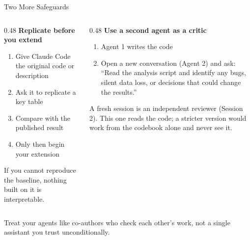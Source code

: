 \documentclass[aspectratio=169, 11pt]{beamer}
\begin{document}
\begin{frame}{Two More Safeguards}
  \begin{columns}[T]
    \begin{column}{0.48\textwidth}
      \textbf{Replicate before you extend}
      \begin{enumerate}
        \small
        \item Give Claude Code the original code or description
        \item Ask it to replicate a key table
        \item Compare with the published result
        \item Only then begin your extension
      \end{enumerate}
      {\small If you cannot reproduce the baseline, nothing built on it is interpretable.}
    \end{column}
    \begin{column}{0.48\textwidth}
      \textbf{Use a second agent as a critic}
      \begin{enumerate}
        \small
        \item Agent 1 writes the code
        \item Open a new conversation (Agent 2) and ask: ``Read the analysis script and identify any bugs, silent data loss, or decisions that could change the results.''
      \end{enumerate}
      {\small A fresh session is an independent reviewer (Session 2). This one reads the code; a stricter version would work from the codebook alone and never see it.}
    \end{column}
  \end{columns}

  \vspace{0.8em}
  \alert{Treat your agents like co-authors who check each other's work, not a single assistant you trust unconditionally.}
\end{frame}
\end{document}

